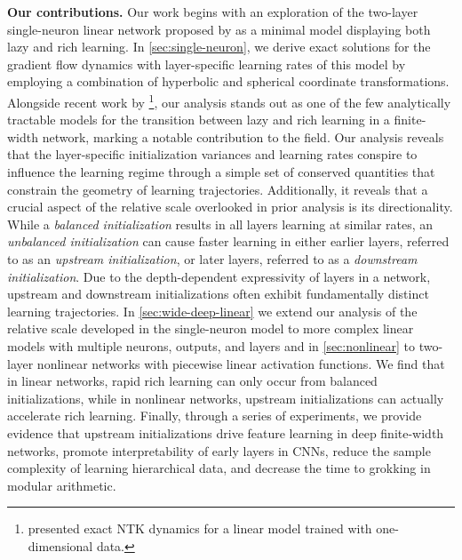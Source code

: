 \documentclass{article}
\theoremstyle{plain}
\theoremstyle{definition}
\theoremstyle{remark}
\begin{document}
\textbf{Our contributions.}
%
Our work begins with an exploration of the two-layer single-neuron linear network proposed by \citet{azulay2021implicit} as a minimal model displaying both lazy and rich learning.
%
In \cref{sec:single-neuron}, we derive exact solutions for the gradient flow dynamics with layer-specific learning rates of this model by employing a combination of hyperbolic and spherical coordinate transformations.
%
Alongside recent work by \citet{xu2024does}\footnote{\citet{xu2024does} presented exact NTK dynamics for a linear model trained with one-dimensional data.}, our analysis stands out as one of the few analytically tractable models for the transition between lazy and rich learning in a finite-width network, marking a notable contribution to the field.
%
Our analysis reveals that the layer-specific initialization variances and learning rates conspire to influence the learning regime through a simple set of conserved quantities that constrain the geometry of learning trajectories.
%
Additionally, it reveals that a crucial aspect of the relative scale overlooked in prior analysis is its directionality.
%
While a \emph{balanced initialization} results in all layers learning at similar rates, an \emph{unbalanced initialization} can cause faster learning in either earlier layers, referred to as an \emph{upstream initialization}, or later layers, referred to as a \emph{downstream initialization}. 
%
Due to the depth-dependent expressivity of layers in a network, upstream and downstream initializations often exhibit fundamentally distinct learning trajectories.
%
In \cref{sec:wide-deep-linear} we extend our analysis of the relative scale developed in the single-neuron model to more complex linear models with multiple neurons, outputs, and layers and in \cref{sec:nonlinear} to two-layer nonlinear networks with piecewise linear activation functions.
%
We find that in linear networks, rapid rich learning can only occur from balanced initializations, while in nonlinear networks, upstream initializations can actually accelerate rich learning.
%
Finally, through a series of experiments, we provide evidence that upstream initializations drive feature learning in deep finite-width networks, promote interpretability of early layers in CNNs, reduce the sample complexity of learning hierarchical data, and decrease the time to grokking in modular arithmetic.
\end{document}
